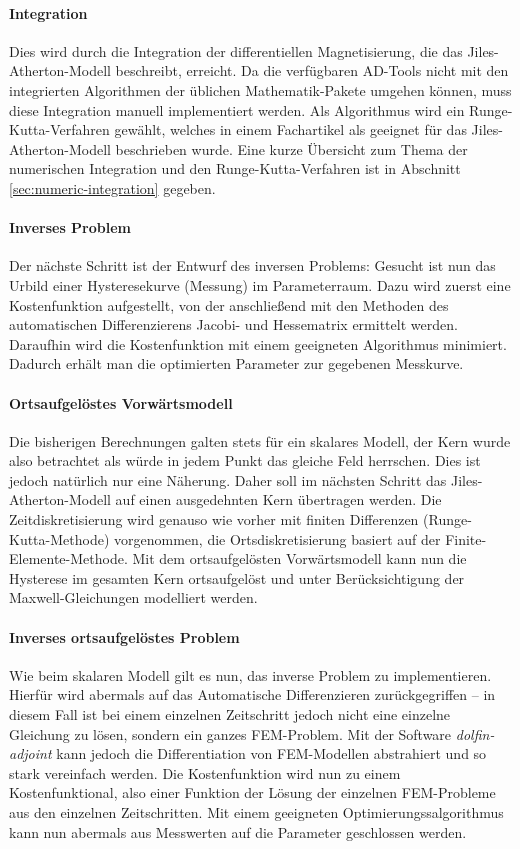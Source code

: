 \documentclass{scrartcl}
\begin{document}
\paragraph{Integration} Dies wird durch die Integration der differentiellen Magnetisierung, die das Jiles-Atherton-Modell beschreibt, erreicht. Da die verfügbaren AD-Tools nicht mit den  integrierten Algorithmen der üblichen Mathematik-Pakete umgehen können, muss diese Integration manuell implementiert werden. Als Algorithmus wird ein Runge-Kutta-Verfahren gewählt, welches in einem Fachartikel als geeignet für das Jiles-Atherton-Modell beschrieben wurde. Eine kurze Übersicht zum Thema der numerischen Integration und den Runge-Kutta-Verfahren ist in Abschnitt \ref{sec:numeric-integration} gegeben.
\paragraph{Inverses Problem} Der nächste Schritt ist der Entwurf des inversen Problems: Gesucht ist nun das Urbild einer Hysteresekurve (Messung) im Parameterraum. Dazu wird zuerst eine Kostenfunktion aufgestellt, von der anschließend mit den Methoden des automatischen Differenzierens Jacobi- und Hessematrix ermittelt werden. Daraufhin wird die Kostenfunktion mit einem geeigneten Algorithmus minimiert. Dadurch erhält man die optimierten Parameter zur gegebenen Messkurve.\\
\paragraph{Ortsaufgelöstes Vorwärtsmodell}
Die bisherigen Berechnungen galten stets für ein skalares Modell, der Kern wurde also betrachtet als würde in jedem Punkt das gleiche Feld herrschen. Dies ist jedoch natürlich nur eine Näherung. Daher soll im nächsten Schritt das Jiles-Atherton-Modell auf einen ausgedehnten Kern übertragen werden. Die Zeitdiskretisierung wird genauso wie vorher mit finiten Differenzen (Runge-Kutta-Methode) vorgenommen, die Ortsdiskretisierung basiert auf der Finite-Elemente-Methode. Mit dem ortsaufgelösten Vorwärtsmodell kann nun die Hysterese im gesamten Kern ortsaufgelöst und unter Berücksichtigung der Maxwell-Gleichungen modelliert werden.
\paragraph{Inverses ortsaufgelöstes Problem}
Wie beim skalaren Modell gilt es nun, das inverse Problem zu implementieren. Hierfür wird abermals auf das Automatische Differenzieren zurückgegriffen -- in diesem Fall ist bei einem einzelnen Zeitschritt jedoch nicht eine einzelne Gleichung zu lösen, sondern ein ganzes FEM-Problem. Mit der Software \emph{dolfin-adjoint} kann jedoch die Differentiation von FEM-Modellen abstrahiert und so stark vereinfach werden. Die Kostenfunktion wird nun zu einem Kostenfunktional, also einer Funktion der Lösung der einzelnen FEM-Probleme aus den einzelnen Zeitschritten. Mit einem geeigneten Optimierungssalgorithmus kann nun abermals aus Messwerten auf die Parameter geschlossen werden.
\end{document}

